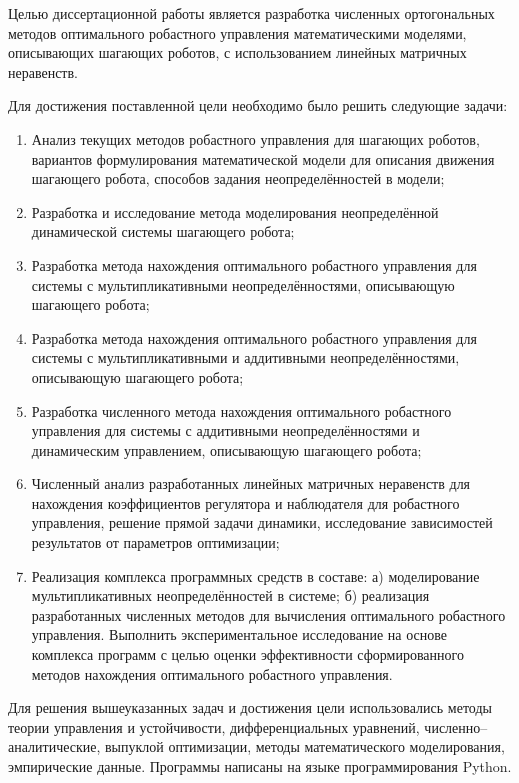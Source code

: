 {\aimtasks} 

Целью диссертационной работы является разработка численных ортогональных методов оптимального робастного управления математическими моделями, описывающих шагающих роботов, с использованием линейных матричных неравенств.

Для достижения поставленной цели необходимо было решить следующие задачи:
\begin{enumerate}[beginpenalty=10000] %
	\item Анализ текущих методов робастного управления для шагающих роботов, вариантов формулирования математической модели для описания движения шагающего робота, способов задания неопределённостей в модели;
	\item Разработка и исследование метода моделирования неопределённой динамической системы шагающего робота; 
	\item Разработка метода нахождения оптимального робастного управления для системы с мультипликативными неопределённостями, описывающую шагающего робота;
	\item Разработка метода нахождения оптимального робастного управления для системы с мультипликативными и аддитивными неопределённостями, описывающую шагающего робота;
	\item Разработка численного метода нахождения оптимального робастного управления для системы с аддитивными неопределённостями и динамическим управлением, описывающую шагающего робота;
	\item Численный анализ разработанных линейных матричных неравенств для нахождения коэффициентов регулятора и наблюдателя для робастного управления, решение прямой задачи динамики, исследование зависимостей результатов от параметров оптимизации;
	\item Реализация комплекса программных средств в составе: а) моделирование мультипликативных неопределённостей в системе; б) реализация разработанных численных методов для вычисления оптимального робастного управления. Выполнить экспериментальное исследование на основе комплекса программ с целью оценки эффективности сформированного методов нахождения оптимального робастного управления.
\end{enumerate}

{\methods} 

Для решения вышеуказанных задач и достижения цели использовались методы теории управления и устойчивости, дифференциальных уравнений, численно--аналитические, выпуклой оптимизации, методы математического моделирования, эмпирические данные. Программы написаны на языке программирования Python.


